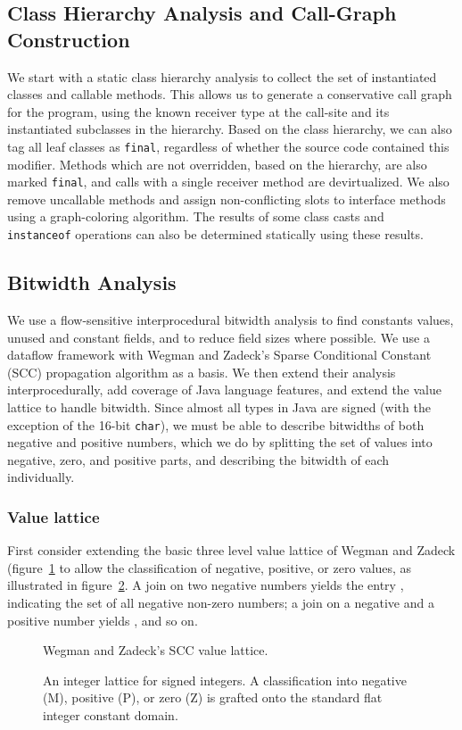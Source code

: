 \documentclass{acmconf}
\newcommand{\figscale}{1.0}
\begin{document}
\subsection{Class Hierarchy Analysis and Call-Graph Construction}
We start with a static class hierarchy analysis to collect the set of
instantiated classes and callable methods.  This allows us to generate
a conservative call graph for the program, using the known receiver
type at the call-site and its instantiated subclasses in the
hierarchy.  Based on the class hierarchy, we can also tag all leaf
classes as {\tt final}, regardless of whether the source code contained
this modifier.  Methods which are not overridden, based on
the hierarchy, are also marked {\tt final}, and calls with a single
receiver method are devirtualized.  We also remove uncallable methods
and assign non-conflicting slots to interface methods using a
graph-coloring algorithm.  The results of some class casts and {\tt
  instanceof} operations can also be determined statically using
these results.

\subsection{Bitwidth Analysis}
We use a flow-sensitive interprocedural bitwidth analysis to
find constants values, unused and constant fields, and to reduce
field sizes where possible.  We use a dataflow framework with
Wegman and Zadeck's Sparse Conditional Constant (SCC) propagation
algorithm \cite{wegman91:scc} as a basis.  We then extend their
analysis interprocedurally, add coverage of Java language features,
and extend the value lattice to handle bitwidth.
Since almost all types in Java are signed (with the exception of the
16-bit {\tt char}), we must be able to describe bitwidths of both
negative and positive numbers, which we do by splitting the set of
values into negative, zero, and positive parts, and describing the
bitwidth of each individually.

\subsubsection{Value lattice}
First consider extending the basic three level value lattice of Wegman and
Zadeck (figure~\ref{fig:wzlat} to allow the classification of
negative, positive, or zero
values, as illustrated in figure~\ref{fig:scclat6}.
A join on two negative numbers yields the entry ,
indicating the set of all negative non-zero numbers; a
join on a negative and a positive number yields , and so on.
\begin{figure}
\centering\renewcommand{\figscale}{0.6}
\caption{Wegman and Zadeck's SCC value lattice.}
\label{fig:wzlat}
\end{figure}
\begin{figure}
\centering\renewcommand{\figscale}{0.6}
\caption[An integer lattice for signed integers.]
{An integer lattice for signed integers. A classification into
negative (M), positive (P), or zero (Z) is grafted onto the standard
flat integer constant domain.}
\label{fig:scclat6}
\end{figure}
\end{document}
